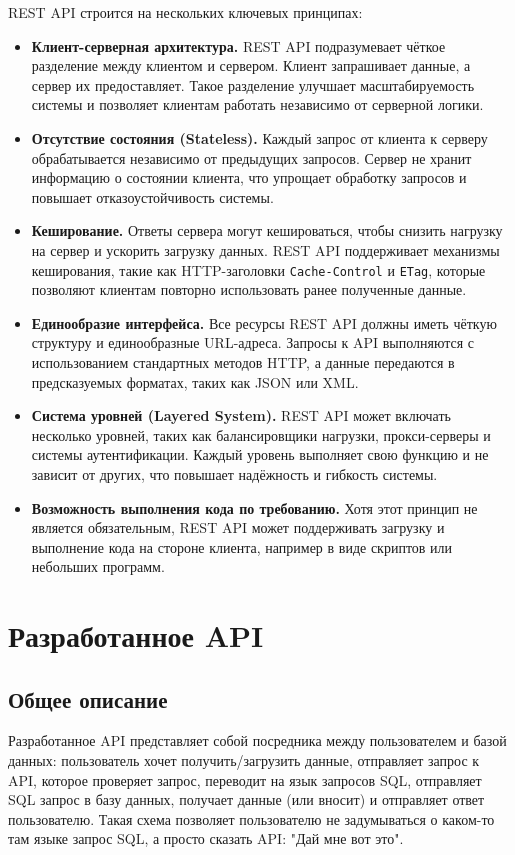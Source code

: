 REST API строится на нескольких ключевых принципах:
\begin{itemize}
    \item \textbf{Клиент-серверная архитектура.}  
    REST API подразумевает чёткое разделение между клиентом и сервером. Клиент запрашивает данные, а сервер их предоставляет. Такое разделение улучшает масштабируемость системы и позволяет клиентам работать независимо от серверной логики.

    \item \textbf{Отсутствие состояния (Stateless).}  
    Каждый запрос от клиента к серверу обрабатывается независимо от предыдущих запросов. Сервер не хранит информацию о состоянии клиента, что упрощает обработку запросов и повышает отказоустойчивость системы.

    \item \textbf{Кеширование.}  
    Ответы сервера могут кешироваться, чтобы снизить нагрузку на сервер и ускорить загрузку данных. REST API поддерживает механизмы кеширования, такие как HTTP-заголовки \texttt{Cache-Control} и \texttt{ETag}, которые позволяют клиентам повторно использовать ранее полученные данные.

    \item \textbf{Единообразие интерфейса.}  
    Все ресурсы REST API должны иметь чёткую структуру и единообразные URL-адреса. Запросы к API выполняются с использованием стандартных методов HTTP, а данные передаются в предсказуемых форматах, таких как JSON или XML.

    \item \textbf{Система уровней (Layered System).}  
    REST API может включать несколько уровней, таких как балансировщики нагрузки, прокси-серверы и системы аутентификации. Каждый уровень выполняет свою функцию и не зависит от других, что повышает надёжность и гибкость системы.

    \item \textbf{Возможность выполнения кода по требованию.}  
    Хотя этот принцип не является обязательным, REST API может поддерживать загрузку и выполнение кода на стороне клиента, например в виде скриптов или небольших программ.
\end{itemize}

\section{Разработанное API}

\subsection{Общее описание}
Разработанное API представляет собой посредника между пользователем и базой данных: пользователь хочет получить/загрузить данные, отправляет запрос к API, которое
проверяет запрос, переводит на язык запросов SQL, отправляет SQL запрос в базу данных, получает данные (или вносит) и отправляет ответ пользователю. Такая
схема позволяет пользователю не задумываться о каком-то там языке запрос SQL, а просто сказать API: "Дай мне вот это". \\

